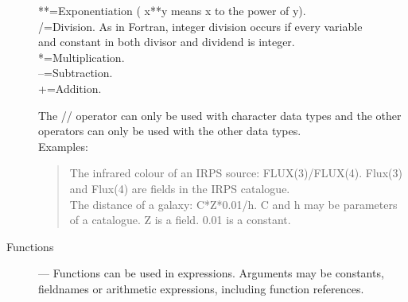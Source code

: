 \begin{description}
\begin{tabbing}
\>**\>=\>Exponentiation ( x**y means x to the power of y).\\
\>/\>=\>Division.  As in Fortran, integer division occurs if every variable\\
\>\>\>and constant in both divisor and dividend is integer.\\
\>*\>=\>Multiplication.\\
\>--\>=\>Subtraction.\\
\>+\>=\>Addition.
\end{tabbing}
The // operator can only be used with character data types and the other
operators can only be used with the other data types.\\
Examples:
\begin{quote}
The infrared colour of an IRPS source:  FLUX(3)/FLUX(4).
Flux(3) and Flux(4) are fields in the IRPS catalogue.\\
The distance of a galaxy:  C*Z*0.01/h.
C and h may be parameters of a catalogue.
Z is a field.
0.01 is a constant.
\end{quote}
\item [Functions] ---
Functions can be used in expressions.
Arguments may be constants, fieldnames or arithmetic expressions,
including function references.


\end{description}
